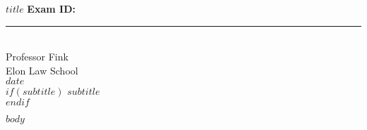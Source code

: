 \documentclass[letterpaper,10pt,twoside]{article}
\begin{document}
\thispagestyle{empty}

\begin{flushleft}
\rmfamily\normalsize{$title$} \hfill\normalsize{\rmfamily\bfseries{Exam ID: }}\rule{3cm}{0.4pt}\\
\rmfamily\normalsize{Professor Fink} \\
\rmfamily\normalsize{Elon Law School}\\
\rmfamily\normalsize{$date$}\\
$if(subtitle)$
\vspace{.6cm}
\titlefont\large{$subtitle$} \\
\vspace{-.6cm}
$endif$
\end{flushleft}

\RaggedRight

\singlespacing


$body$
\end{document}
